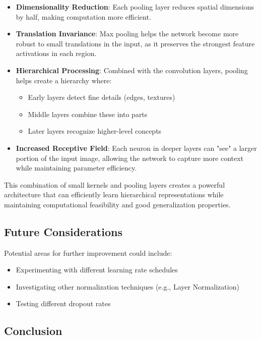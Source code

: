 \begin{itemize}
    \item \textbf{Dimensionality Reduction}: Each pooling layer reduces spatial dimensions by half, making computation more efficient.
    
    \item \textbf{Translation Invariance}: Max pooling helps the network become more robust to small translations in the input, as it preserves the strongest feature activations in each region.
    
    \item \textbf{Hierarchical Processing}: Combined with the convolution layers, pooling helps create a hierarchy where:
    \begin{itemize}
        \item Early layers detect fine details (edges, textures)
        \item Middle layers combine these into parts
        \item Later layers recognize higher-level concepts
    \end{itemize}
    
    \item \textbf{Increased Receptive Field}: Each neuron in deeper layers can "see" a larger portion of the input image, allowing the network to capture more context while maintaining parameter efficiency.
\end{itemize}

This combination of small kernels and pooling layers creates a powerful architecture that can efficiently learn hierarchical representations while maintaining computational feasibility and good generalization properties.

\subsection{Future Considerations}

Potential areas for further improvement could include:
\begin{itemize}
    \item Experimenting with different learning rate schedules
    \item Investigating other normalization techniques (e.g., Layer Normalization)
    \item Testing different dropout rates
\end{itemize}

\subsection{Conclusion}

